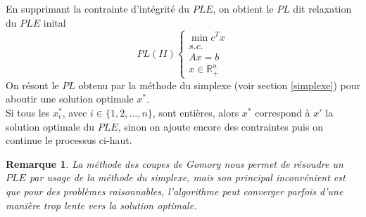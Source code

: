 \documentclass[a4paper,11pt,oneside]{report}
\newtheorem{remarque}{Remarque}[section]
\theoremstyle{plain}
\newcommand{\0}{/ \! \! \! 0}
\theoremstyle{plain}
\begin{document}
En supprimant la contrainte d'int\'egrit\'e du $PLE$, on obtient le $PL$ dit relaxation du $PLE$ inital
 \begin{equation}
 PL(II) \left\{\begin{array}{l}
			    \min  c^Tx  \\
			    s.c.         \\
			    Ax = b        \\
			    x \in \mathbb{R}_+^n
			  \end{array} 
		    \right.
 \end{equation}
 On r\'esout le $PL$ obtenu par la m\'ethode du simplexe (voir section \ref{simplexe}) pour aboutir une solution optimale $x^*$.\\
 Si tous les  $x_i^*$,  avec $i\in\{1,2,\hdots,n\}$,  sont enti\`eres, alors $x^*$ correspond \`a $x'$ la solution optimale du $PLE$, sinon on ajoute 
 encore des contraintes puis on continue le processus ci-haut.
 \begin{remarque}
  La m\'ethode des coupes de Gomory nous permet de r\'esoudre un $PLE$ par usage de la m\'ethode du simplexe, mais son principal inconv\'enient est que 
  pour des probl\`emes raisonnables, l'algorithme peut converger parfois d'une mani\`ere trop lente vers la solution optimale.
 \end{remarque}
\end{document}
